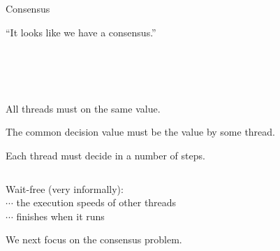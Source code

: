 \begin{frame}{}
  \centerline{\LARGE Consensus}

  \vspace{0.50cm}

  \vspace{-0.30cm} 
  \centerline{``It looks like we have a consensus.''}　
\end{frame}

\begin{frame}{}
  \begin{columns}
      \centerline{\qquad\qquad \large \bf {}}
      \centerline{\large \bf {}\qquad\qquad}
  \end{columns}

  \pause
  \vspace{0.80cm}
  \begin{definition}
    \begin{description}
      \setlength{\itemsep}{5pt}
      \item[Consistent] All  threads must  on the same value.
      \item[Valid] The common decision value must be the value  by some thread.
      \item[Wait-free] Each  thread must decide in a  number of steps.
    \end{description}
  \end{definition}
\end{frame}

\begin{frame}{}
  \begin{columns}
  \end{columns}

  \vspace{0.40cm}
  \begin{center}
    Wait-free {\footnotesize (very informally)}: \\[6pt]

    $\cdots$  the execution speeds of other threads \pause \\[8pt]

    $\cdots$  finishes when it runs 
  \end{center}
\end{frame}

\begin{frame}{}
  
  \centerline{\Large We next focus on the  consensus problem.}
\end{frame}
